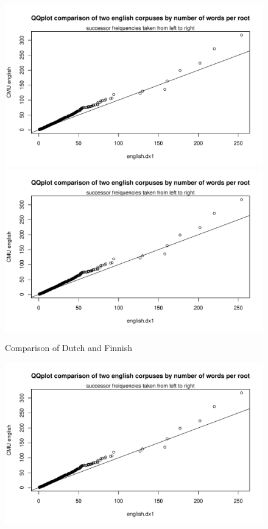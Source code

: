 \documentclass{article}
\begin{document}
		\begin{figure}[H]
		\centering
		\caption{Comparison of Dutch and Finnish}
		\includegraphics[scale=.7,page=7]{plots.pdf}
		\includegraphics[scale=.7,page=8]{plots.pdf}
		\end{figure}
		\begin{figure}[H]
		\centering
		\includegraphics[scale=.7,page=9]{plots.pdf}
		\end{figure}
\end{document}
